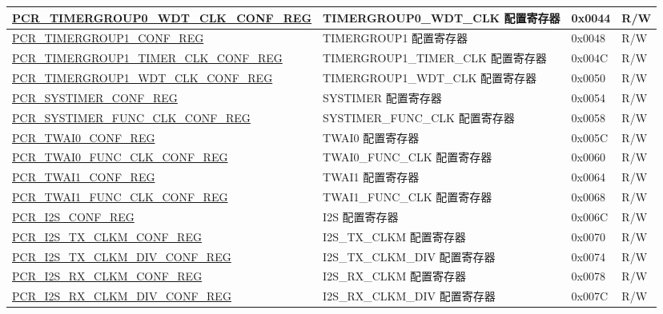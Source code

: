 \begin{longtable}{ | p{6cm} | p{7.2cm} | p{1.3cm} | p{1cm} | }
\hyperref[regdesc:PCRTIMERGROUP0WDTCLKCONFREG]{PCR\_TIMERGROUP0\_WDT\_CLK\_\newline CONF\_REG} & TIMERGROUP0\_WDT\_CLK 配置寄存器 & 0x0044 & R/W \\ \hline
\hyperref[regdesc:PCRTIMERGROUP1CONFREG]{PCR\_TIMERGROUP1\_CONF\_REG} & TIMERGROUP1 配置寄存器 & 0x0048 & R/W \\ \hline
\hyperref[regdesc:PCRTIMERGROUP1TIMERCLKCONFREG]{PCR\_TIMERGROUP1\_TIMER\_CLK\_\newline CONF\_REG} & TIMERGROUP1\_TIMER\_CLK 配置寄存器 & 0x004C & R/W \\ \hline
\hyperref[regdesc:PCRTIMERGROUP1WDTCLKCONFREG]{PCR\_TIMERGROUP1\_WDT\_CLK\_\newline CONF\_REG} & TIMERGROUP1\_WDT\_CLK 配置寄存器 & 0x0050 & R/W \\ \hline
\hyperref[regdesc:PCRSYSTIMERCONFREG]{PCR\_SYSTIMER\_CONF\_REG} & SYSTIMER 配置寄存器 & 0x0054 & R/W \\ \hline
\hyperref[regdesc:PCRSYSTIMERFUNCCLKCONFREG]{PCR\_SYSTIMER\_FUNC\_CLK\_CONF\newline\_REG} & SYSTIMER\_FUNC\_CLK 配置寄存器 & 0x0058 & R/W \\ \hline
\hyperref[regdesc:PCRTWAI0CONFREG]{PCR\_TWAI0\_CONF\_REG} & TWAI0 配置寄存器 & 0x005C & R/W \\ \hline
\hyperref[regdesc:PCRTWAI0FUNCCLKCONFREG]{PCR\_TWAI0\_FUNC\_CLK\_CONF\_REG} & TWAI0\_FUNC\_CLK 配置寄存器 & 0x0060 & R/W \\ \hline
\hyperref[regdesc:PCRTWAI1CONFREG]{PCR\_TWAI1\_CONF\_REG} & TWAI1 配置寄存器 & 0x0064 & R/W \\ \hline
\hyperref[regdesc:PCRTWAI1FUNCCLKCONFREG]{PCR\_TWAI1\_FUNC\_CLK\_CONF\_REG} & TWAI1\_FUNC\_CLK 配置寄存器 & 0x0068 & R/W \\ \hline
\hyperref[regdesc:PCRI2SCONFREG]{PCR\_I2S\_CONF\_REG} & I2S 配置寄存器 & 0x006C & R/W \\ \hline
\hyperref[regdesc:PCRI2STXCLKMCONFREG]{PCR\_I2S\_TX\_CLKM\_CONF\_REG} & I2S\_TX\_CLKM 配置寄存器 & 0x0070 & R/W \\ \hline
\hyperref[regdesc:PCRI2STXCLKMDIVCONFREG]{PCR\_I2S\_TX\_CLKM\_DIV\_CONF\_REG} & I2S\_TX\_CLKM\_DIV 配置寄存器 & 0x0074 & R/W \\ \hline
\hyperref[regdesc:PCRI2SRXCLKMCONFREG]{PCR\_I2S\_RX\_CLKM\_CONF\_REG} & I2S\_RX\_CLKM 配置寄存器 & 0x0078 & R/W \\ \hline
\hyperref[regdesc:PCRI2SRXCLKMDIVCONFREG]{PCR\_I2S\_RX\_CLKM\_DIV\_CONF\_REG} & I2S\_RX\_CLKM\_DIV 配置寄存器 & 0x007C & R/W \\ \hline

\end{longtable}
